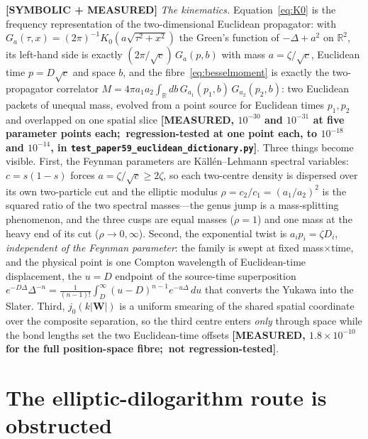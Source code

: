 \documentclass[aps,pra,twocolumn,superscriptaddress,longbibliography]{revtex4-2}
\begin{document}
\textbf{[SYMBOLIC + MEASURED]} \emph{The kinematics.} Equation~\eqref{eq:K0} is the frequency
representation of the two-dimensional Euclidean propagator: with
$G_{a}(\tau,x)=(2\pi)^{-1}K_{0}(a\sqrt{\tau^{2}+x^{2}})$ the Green's function of
$-\Delta+a^{2}$ on $\mathbb{R}^{2}$, its left-hand side is exactly
$(2\pi/\sqrt{c})\,G_{a}(p,b)$ with mass $a=\zeta/\sqrt{c}$, Euclidean time $p=D\sqrt{c}$ and
space $b$, and the fibre~\eqref{eq:besselmoment} is exactly the two-propagator correlator
$M=4\pi a_{1}a_{2}\int_{\mathbb{R}}db\,G_{a_{1}}(p_{1},b)\,G_{a_{2}}(p_{2},b)$: two Euclidean
packets of unequal mass, evolved from a point source for Euclidean times $p_{1},p_{2}$ and
overlapped on one spatial slice \textbf{[MEASURED, $10^{-30}$ and $10^{-31}$ at five parameter
points each;\ regression-tested at one point each, to $10^{-18}$ and $10^{-14}$, in
\texttt{test\_paper59\_euclidean\_dictionary.py}]}. Three things become visible.
First, the Feynman parameters are
K\"all\'en--Lehmann spectral variables: $c=s(1-s)$ forces $a=\zeta/\sqrt{c}\ge2\zeta$, so each
two-centre density is dispersed over its own two-particle cut and the elliptic modulus
$\rho=c_{2}/c_{1}=(a_{1}/a_{2})^{2}$ is the squared ratio of the two spectral masses---the
genus jump is a mass-splitting phenomenon, and the three cusps are equal masses ($\rho=1$)
and one mass at the heavy end of its cut ($\rho\to0,\infty$). Second, the exponential twist
is $a_{i}p_{i}=\zeta D_{i}$, \emph{independent of the Feynman parameter}: the family is swept
at fixed mass$\times$time, and the physical point is one Compton wavelength of Euclidean-time
displacement, the $u=D$ endpoint of the source-time superposition
$e^{-D\Delta}\Delta^{-n}=\frac{1}{(n-1)!}\int_{D}^{\infty}(u-D)^{n-1}e^{-u\Delta}\,du$ that
converts the Yukawa into the Slater. Third, $j_{0}(k|\bm W|)$ is a uniform smearing of the
shared spatial coordinate over the composite separation, so the third centre enters
\emph{only} through space while the bond lengths set the two Euclidean-time offsets
\textbf{[MEASURED, $1.8\times10^{-10}$ for the full position-space fibre;\ not regression-tested]}.

\section{The elliptic-dilogarithm route is obstructed}
\label{sec:obstruction}
\end{document}
